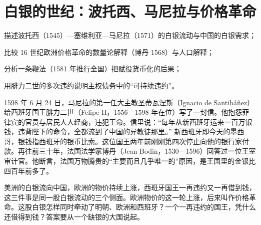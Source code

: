 \chapter{白银的世纪：波托西、马尼拉与价格革命}\label{ch:silver}

\begin{chapterguide}
\begin{guidegoals}
\item 描述波托西（1545）—塞维利亚—马尼拉（1571）的白银流动与中国的白银需求；
\item 比较 16 世纪欧洲价格革命的数量论解释（博丹 1568）与人口解释；
\item 分析一条鞭法（1581 年推行全国）把赋役货币化的后果；
\item 用腓力二世的多次违约说明主权债务中的“可持续违约”。
\end{guidegoals}
\end{chapterguide}

1598 年 6 月 24 日，马尼拉的第一任大主教圣蒂瓦涅斯（Ignacio de Santibáñez）给西班牙国王腓力二世（Felipe II，1556—1598 年在位）写了一封信。他抱怨菲律宾的官员与居民人人经商，违犯王命。信里说：“每年从新西班牙运来一百万银钱，违背陛下的命令，全都流到了中国的异教徒那里。”\cite{br} 新西班牙即今天的墨西哥，银钱指西班牙的银币比索。这位国王两年前刚刚第四次停止向他的银行家付款\cite{dv2010}。再往前三十年，法国法学家博丹（Jean Bodin，1530—1596）回答过一位王室审计官。他断言，法国万物腾贵的“主要而且几乎唯一的”原因，是王国里的金银比四百年前多了\cite{lebranchu1934}。

美洲的白银流向中国，欧洲的物价持续上涨，西班牙国王一再违约又一再借到钱，这三件事是同一股白银流动的三个侧面。欧洲物价的这一轮上涨，后来叫作价格革命。这股白银怎样同时牵动了明朝、欧洲和西班牙？一个一再违约的国王，凭什么还借得到钱？答案要从一个缺银的大国说起。

